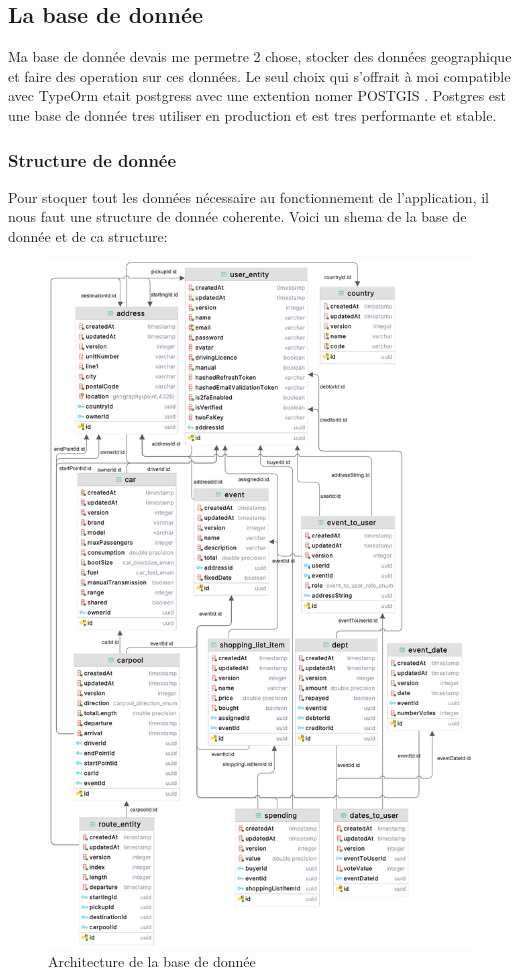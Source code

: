 \subsection{La base de donnée}\label{subsec:la-base-de-donnee}
Ma base de donnée devais me permetre 2 chose, stocker des données geographique et faire des operation sur ces données.
Le seul choix qui s'offrait à moi compatible avec TypeOrm etait postgress avec une extention nomer POSTGIS .
Postgres est une base de donnée tres utiliser en production et est tres performante et stable.

\subsubsection{Structure de donnée}
Pour stoquer tout les données nécessaire au fonctionnement de l'application, il nous faut une structure de donnée coherente.
Voici un shema de la base de donnée et de ca structure:
\begin{figure}[ht]
    \includegraphics[width=\textwidth]{./images/dbShema}\caption{Architecture de la base de donnée}\label{fig:dbSchema}
    \centering
\end{figure}
\newpage

